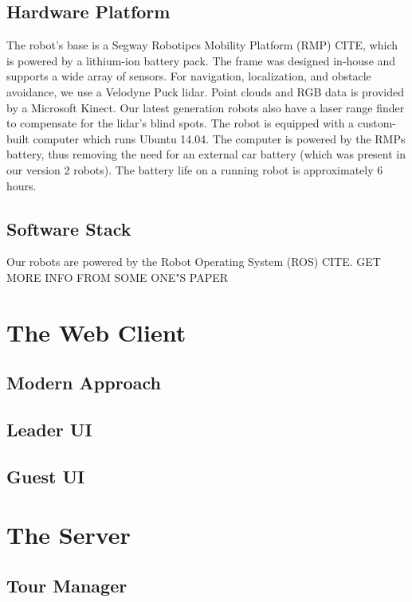 \documentclass{sig-alternate-05-2015}
\begin{document}
\subsection{Hardware Platform}

The robot's base is a Segway Robotipcs Mobility Platform (RMP) {CITE}, which is
powered by a lithium-ion battery pack. The frame was designed in-house and
supports a wide array of sensors. For navigation, localization, and obstacle
avoidance, we use a Velodyne Puck lidar. Point clouds and RGB data is provided
by a Microsoft Kinect. Our latest generation robots also have a laser range
finder to compensate for the lidar's blind spots. The robot is equipped with a
custom-built computer which runs Ubuntu 14.04. The computer is powered by the
RMPs battery, thus removing the need for an external car battery (which was
present in our version 2 robots).  The battery life on a running robot is
approximately 6 hours.

\subsection{Software Stack}

Our robots are powered by the Robot Operating System (ROS) {CITE}. {GET MORE
INFO FROM SOME ONE"S PAPER}

\section{The Web Client}

\subsection{Modern Approach}

\subsection{Leader UI}

\subsection{Guest UI}

\section{The Server}

\subsection{Tour Manager}
\end{document}
